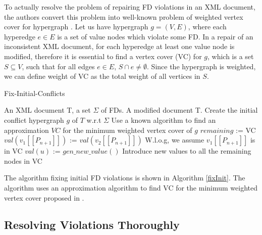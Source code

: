 To actually resolve the problem of repairing FD violations in an XML document, the authors convert this problem into well-known problem of weighted vertex cover for hypergraph \cite{ApproxAlgo}. Let us have hypergraph $g = (V,E)$, where each hyperedge $e \in E$ is a set of value nodes which violate some FD. In a repair of an inconsistent XML document, for each hyperedge at least one value node is modified, therefore it is essential to find a vertex cover (VC) for $g$, which is a set $S \subseteq V$, such that for all edges $e \in E$, $S \cap e \neq \emptyset$. Since the hypergraph is weighted, we can define weight of VC as the total weight of all vertices in $S$.\\

\begin{algorithm}[H]
\caption{Fix-Initial-Conflicts}
\label{fixInit}
\begin{algorithmic}[1]
\REQUIRE An XML document T, a set $\Sigma$ of FDs.
\ENSURE A modified document T.
\STATE \COMMENT Create the initial conflict hypergraph $g$ of $T$ w.r.t $\Sigma$
\STATE \COMMENT Use a known algorithm to find an approximation $VC$ for the minimum weighted vertex cover of $g$
\STATE $remaining$ := VC
\STATE $val(v_1[\![P_{n+1}]\!])$ := $val(v_2[\![P_{n+1}]\!])$ \COMMENT W.l.o.g, we assume $v_1[\![P_{n+1}]\!]$ is in VC
\ENDWHILE
{}
\STATE $val(u)$ := $gen\_new\_value()$
\STATE \COMMENT Introduce new values to all the remaining nodes in VC
\ENDFOR
\end{algorithmic}
\end{algorithm}

The algorithm fixing initial FD violations is shown in Algorithm \ref{fixInit}. The algorithm uses an approximation algorithm to find VC for the minimum weighted vertex cover proposed in \cite{ApproxAlgo}.

\subsection{Resolving Violations Thoroughly}

